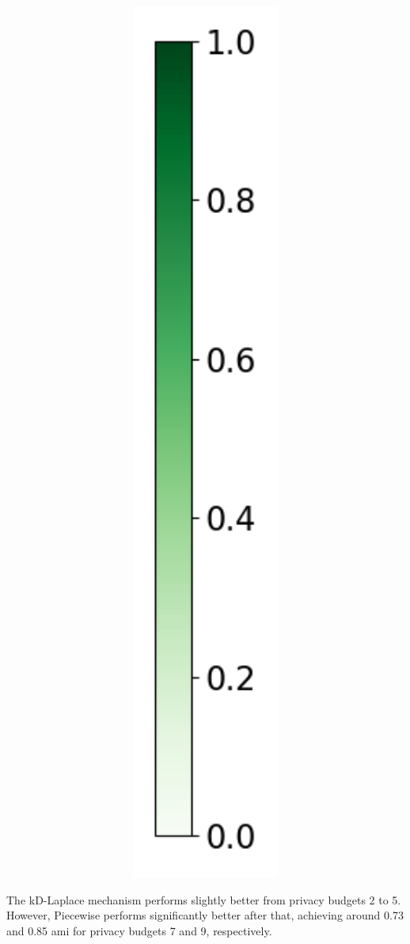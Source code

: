\begin{figure}[H]
\begin{subfigure}[b]{0.075\textwidth}
            \includegraphics[width=1\textwidth]{Results/kd-laplace/kd-Laplace/skewed-dataset/heatmap_legend_ami.png}
      \end{subfigure}
\end{figure}
The kD-Laplace mechanism performs slightly better from privacy budgets 2 to 5. However, Piecewise performs significantly better after that, achieving around 0.73 and 0.85 \gls{ami} for privacy budgets 7 and 9, respectively.

